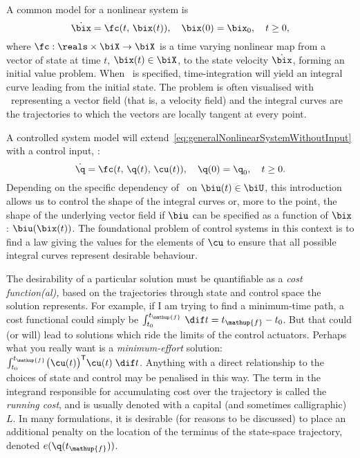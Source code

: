 A common model for a nonlinear system is
%
\begin{equation}\label{eq:generalNonlinearSystemWithoutInput}
  \dot{\bix} = \fc(t,\, \bix(t)),\quad \bix(0) = \bix_0, \quad t\ge0,
\end{equation}
%
where $\fc : \reals\times\biX\rightarrow \biX$ is a time varying nonlinear map
from a vector of state at time $t$, $\bix(t)\in\biX$, to the state velocity
$\dot\bix$, forming an initial value problem. When \fc\ is specified,
time-integration will yield an integral curve leading from the initial state.
The problem is often visualised with \fc\ representing a vector field (that is,
a velocity field) and the integral curves are the trajectories to which the
vectors are locally tangent at every point.

A controlled system model will
extend~\eqref{eq:generalNonlinearSystemWithoutInput} with a control input, \cu:
%
\begin{equation}\label{eq:generalNonlinearSystem}
  \dot{\q} = \fc(t,\, \q(t),\, \cu(t)),\quad \q(0) = \q_0,\quad t\ge0.
\end{equation}
%
Depending on the specific dependency of \fc\ on $\biu(t)\in \biU$, this
introduction allows us to control the shape of the integral curves or, more to
the point, the shape of the underlying vector field if $\biu$ can be specified
as a function of $\bix$: $\biu(\bix(t))$. The foundational problem of control
systems in this context is to find a law giving the values for the elements of
$\cu$ to ensure that all possible integral curves represent desirable behaviour.

The desirability of a particular solution must be quantifiable as a \emph{cost
function(al),} based on the trajectories through state and control space the
solution represents. For example, if I am trying to find a minimum-time path, a
cost functional could simply be $\int_{t_0}^{t_\mathup{f}}\,\dif t =
t_\mathup{f} - t_0$. But that could (or will) lead to solutions which ride the
limits of the control actuators. Perhaps what you really want is a
\emph{minimum-effort} solution: $\int_{t_0}^{t_\mathup{f}}
\bigl(\cu(t)\bigr)\tr\cu(t)\; \dif t$. Anything with a direct relationship to
the choices of state and control may be penalised in this way. The term in the
integrand responsible for accumulating cost over the trajectory is called the
\emph{running cost}, and is usually denoted with a capital
(and sometimes calligraphic) $L$. In many
formulations, it is desirable (for reasons to be discussed) to place an
additional penalty on the location of the terminus of the state-space
trajectory, denoted $e(\q(t_\mathup{f}))$.

